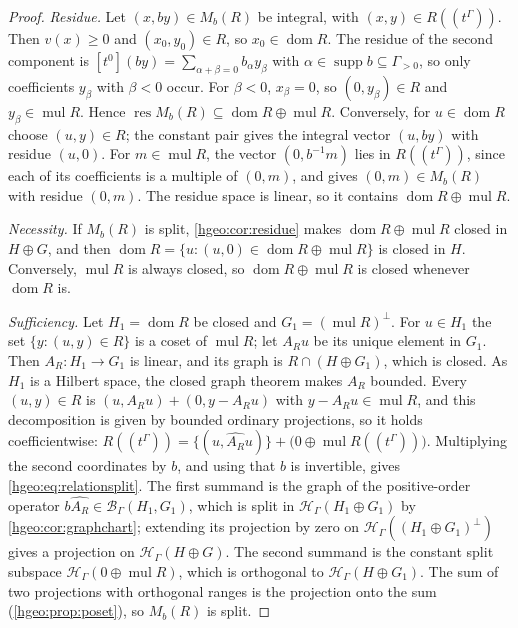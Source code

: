 \documentclass[11pt,letterpaper]{article}
\numberwithin{equation}{section}
\theoremstyle{definition}
\theoremstyle{remark}
\newcommand{\HH}[1]{\mathscr H_\Gamma(#1)}
\newcommand{\BB}[2]{\mathscr B_\Gamma(#1,#2)}
\newcommand{\supp}{\operatorname{supp}}
\newcommand{\dom}{\operatorname{dom}}
\newcommand{\mul}{\operatorname{mul}}
\newcommand{\res}{\operatorname{res}}
\newcommand{\coeff}[2]{[t^{#1}]#2}
\begin{document}
\begin{proof}
\emph{Residue.} Let $(x,by)\in M_b(R)$ be integral, with
$(x,y)\in R((t^\Gamma))$. Then $v(x)\ge0$ and $(x_0,y_0)\in R$, so
$x_0\in\dom R$. The residue of the second component is
$\coeff{0}{(by)}=\sum_{\alpha+\beta=0}b_\alpha y_\beta$ with
$\alpha\in\supp b\subseteq\Gamma_{>0}$, so only coefficients $y_\beta$ with
$\beta<0$ occur. For $\beta<0$, $x_\beta=0$, so $(0,y_\beta)\in R$ and
$y_\beta\in\mul R$. Hence $\res M_b(R)\subseteq\dom R\oplus\mul R$.
Conversely, for $u\in\dom R$ choose $(u,y)\in R$; the constant pair gives the
integral vector $(u,by)$ with residue $(u,0)$. For $m\in\mul R$, the vector
$(0,b^{-1}m)$ lies in $R((t^\Gamma))$, since each of its coefficients is a
multiple of $(0,m)$, and gives $(0,m)\in M_b(R)$ with residue $(0,m)$.
The residue space is linear, so it contains $\dom R\oplus\mul R$.

\emph{Necessity.} If $M_b(R)$ is split, \cref{hgeo:cor:residue} makes
$\dom R\oplus\mul R$ closed in $H\oplus G$, and then
$\dom R=\{u:(u,0)\in\dom R\oplus\mul R\}$ is closed in $H$. Conversely,
$\mul R$ is always closed, so $\dom R\oplus\mul R$ is closed whenever
$\dom R$ is.

\emph{Sufficiency.} Let $H_1=\dom R$ be closed and $G_1=(\mul R)^\perp$.
For $u\in H_1$ the set $\{y:(u,y)\in R\}$ is a coset of $\mul R$; let
$A_Ru$ be its unique element in $G_1$. Then $A_R:H_1\to G_1$ is linear, and
its graph is $R\cap(H\oplus G_1)$, which is closed. As $H_1$ is a Hilbert
space, the closed graph theorem makes $A_R$ bounded. Every $(u,y)\in R$ is
$(u,A_Ru)+(0,y-A_Ru)$ with $y-A_Ru\in\mul R$, and this decomposition is given
by bounded ordinary projections, so it holds coefficientwise:
$R((t^\Gamma))=\{(u,\widehat{A_R}u)\}+\bigl(0\oplus\mul R((t^\Gamma))\bigr)$.
Multiplying the second coordinates by $b$, and using that $b$ is invertible,
gives \eqref{hgeo:eq:relationsplit}. The first summand is the graph of the
positive-order operator $b\widehat{A_R}\in\BB{H_1}{G_1}$, which is split in
$\HH{H_1\oplus G_1}$ by \cref{hgeo:cor:graphchart}; extending its projection
by zero on $\HH{(H_1\oplus G_1)^\perp}$ gives a projection on
$\HH{H\oplus G}$. The second summand is the constant split subspace
$\HH{0\oplus\mul R}$, which is orthogonal to $\HH{H\oplus G_1}$. The sum of
two projections with orthogonal ranges is the projection onto the sum
(\cref{hgeo:prop:poset}), so $M_b(R)$ is split.
\end{proof}
\end{document}
